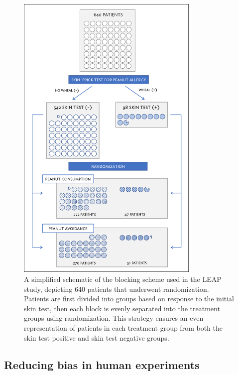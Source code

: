 	\begin{figure}
		\centering
		\includegraphics[width=0.78\textwidth]{ch_intro_to_data_oi_biostat/figures/leapBlocking/leapBlocking.png}
		\caption{A simplified schematic of the blocking scheme used in the LEAP study, depicting 640 patients that underwent randomization. Patients are first divided into groups based on response to the initial skin test, then each block is evenly separated into the treatment groups using randomization. This strategy ensures an even representation of patients in each treatment group from both the skin test positive and skin test negative groups.}
		\label{leapBlocking}
	\end{figure}


\subsection{Reducing bias in human experiments}
\label{biasInHumanExperiments}

